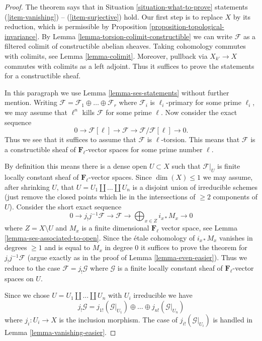 \begin{proof}
The theorem says that in Situation \ref{situation-what-to-prove}
statements (\ref{item-vanishing}) -- (\ref{item-surjective}) hold.
Our first step is to replace $X$ by its reduction, which is permissible
by Proposition \ref{proposition-topological-invariance}.
By Lemma \ref{lemma-torsion-colimit-constructible} we can write
$\mathcal{F}$ as a filtered colimit of constructible abelian sheaves.
Taking cohomology commutes with colimits, see Lemma \ref{lemma-colimit}.
Moreover, pullback via $X_{k'} \to X$ commutes with colimits as a left
adjoint. Thus it suffices to prove the statements for a constructible sheaf.

\medskip\noindent
In this paragraph we use Lemma \ref{lemma-ses-statements} without further
mention. Writing
$\mathcal{F} = \mathcal{F}_1 \oplus \ldots \oplus \mathcal{F}_r$
where $\mathcal{F}_i$ is $\ell_i$-primary for some prime $\ell_i$, we may
assume that $\ell^n$ kills $\mathcal{F}$ for some prime $\ell$. Now consider
the exact sequence
$$
0 \to \mathcal{F}[\ell] \to \mathcal{F} \to \mathcal{F}/\mathcal{F}[\ell] \to 0.
$$
Thus we see that it suffices to assume that $\mathcal{F}$ is $\ell$-torsion.
This means that $\mathcal{F}$ is a constructible sheaf of
$\mathbf{F}_\ell$-vector spaces for some prime number $\ell$.

\medskip\noindent
By definition this means there is a dense open $U \subset X$
such that $\mathcal{F}|_U$ is finite locally constant sheaf of
$\mathbf{F}_\ell$-vector spaces. Since $\dim(X) \leq 1$ we may
assume, after shrinking $U$, that $U = U_1 \amalg \ldots \amalg U_n$
is a disjoint union of irreducible schemes (just remove the closed
points which lie in the intersections of $\geq 2$ components of $U$).
Consider the short exact sequence
$$
0 \to j_!j^{-1}\mathcal{F} \to \mathcal{F} \to
\bigoplus\nolimits_{x \in Z} i_{x *}M_x \to 0
$$
where $Z = X \setminus U$ and $M_x$ is a finite dimensional $\mathbf{F}_\ell$
vector space, see
Lemma \ref{lemma-ses-associated-to-open}. Since the \'etale cohomology
of $i_{x *}M_x$ vanishes in degrees $\geq 1$ and is equal to
$M_x$ in degree $0$ it suffices to prove the theorem for
$j_!j^{-1}\mathcal{F}$ (argue exactly as in the proof of
Lemma \ref{lemma-even-easier}). Thus we reduce to the case
$\mathcal{F} = j_!\mathcal{G}$ where
$\mathcal{G}$ is a finite locally constant sheaf of $\mathbf{F}_\ell$-vector
spaces on $U$.

\medskip\noindent
Since we chose $U = U_1 \amalg \ldots \amalg U_n$ with $U_i$ irreducible
we have
$$
j_!\mathcal{G} =
j_{1!}(\mathcal{G}|_{U_1}) \oplus \ldots \oplus
j_{n!}(\mathcal{G}|_{U_n})
$$
where $j_i : U_i \to X$ is the inclusion morphism.
The case of $j_{i!}(\mathcal{G}|_{U_i})$ is handled in
Lemma \ref{lemma-vanishing-easier}.
\end{proof}

